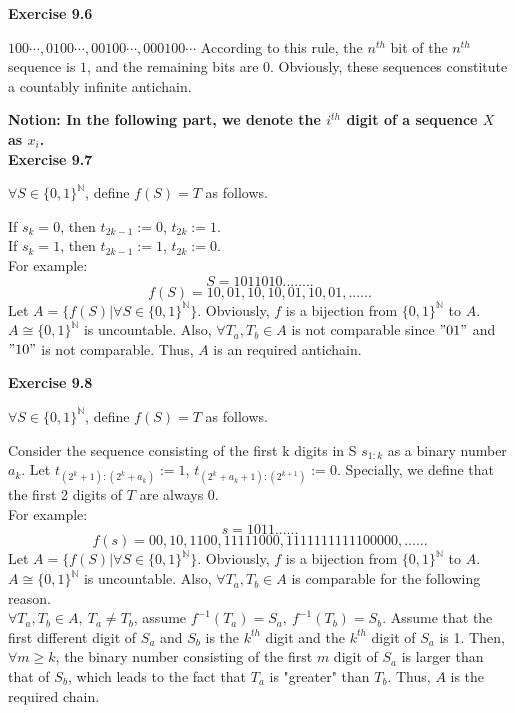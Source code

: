 \documentclass{article} %
\begin{document}
	\textbf{Exercise 9.6}\par
	$100\cdots,0100\cdots,00100\cdots,000100\cdots$ According to this rule, the $n^{th}$ bit of the $n^{th}$ sequence is $1$, and the remaining bits are $0$. Obviously, these sequences constitute a countably infinite antichain.\\ \par

\textbf{Notion: In the following part, we denote the $i^{th}$ digit of a sequence $X$ as $x_i$.}\\

	\textbf{Exercise 9.7}\par
	$\forall S\in {\{0,1\}}^{\mathbb{N}}$, define $f(S)=T$ as follows.\par
	If $s_k=0$, then $t_{2k-1}:=0$, $t_{2k}:=1$.\\ If $s_k=1$, then $t_{2k-1}:=1$, $t_{2k}:=0$.\\
	For example:\\
	$$
	S=1011010........
	$$
	$$
	f(S)=10,01,10,10,01,10,01,......
	$$
	Let $A=\{f(S)|\forall S\in {\{0,1\}}^{\mathbb{N}}\}$. Obviously, $f$ is a bijection from ${\{0,1\}}^{\mathbb{N}}$ to $A$. $A\cong {\{0,1\}}^{\mathbb{N}}$ is uncountable. Also, $\forall T_{a},T_{b}\in A$ is not comparable since $"01"$ and $"10"$ is not comparable.
	Thus, $A$ is an required antichain.\par
	\textbf{Exercise 9.8}\par
	 $\forall S\in {\{0,1\}}^{\mathbb{N}}$, define $f(S)=T$ as follows.\par
	
	 	 Consider the sequence consisting of the first k digits in S $s_{1:k}$ as a binary number $a_k$. Let $t_{(2^{k}+1):(2^{k}+a_k)}:=1$, $t_{(2^{k}+a_k+1):(2^{k+1})}:=0$. Specially, we define that the first 2 digits of $T$ are always $0$.\\
	
	 For example:\\
	 $$
	 s=1011......
	 $$
	 $$
	 f(s)=00,10,1100,11111000,1111111111100000,......
	 $$
	 Let $A=\{f(S)|\forall S\in {\{0,1\}}^{\mathbb{N}}\}$. Obviously, $f$ is a bijection from ${\{0,1\}}^{\mathbb{N}}$ to $A$. $A\cong {\{0,1\}}^{\mathbb{N}}$ is uncountable. Also, $\forall T_a,T_b\in A$ is comparable for the following reason.\\
 $\forall T_a,T_b\in A,\ T_a\neq T_b$, assume $f^{-1}(T_a)=S_a,\ f^{-1}(T_b)=S_b$. Assume that the first different digit of $S_a$ and $S_b$ is the $k^{th}$ digit and the $k^{th}$ digit of $S_a$ is 1. Then, $\forall m \ge k$, the binary number consisting of the first $m$ digit of $S_a$ is larger than that of $S_b$, which leads to the fact that $T_a$ is "greater" than $T_b$. Thus, $A$ is the required chain. \par
\end{document}
